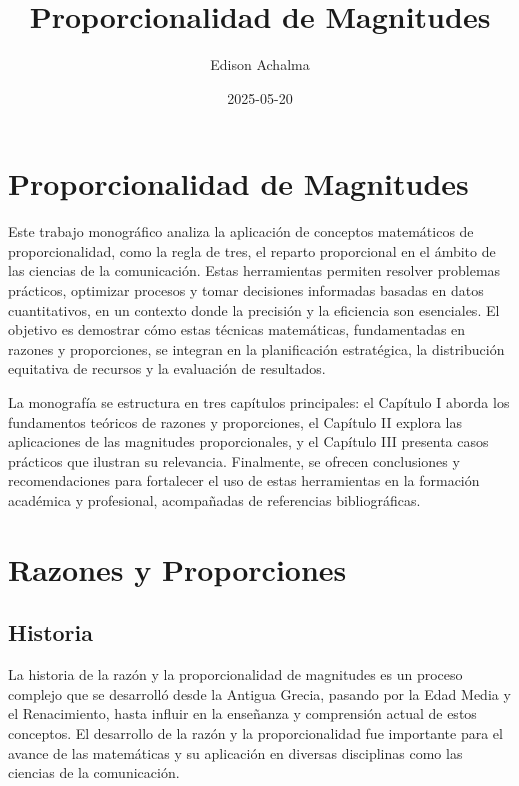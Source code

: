 \documentclass[
  stu,
  floatsintext,
  longtable,
  a4paper,
  nolmodern,
  notxfonts,
  notimes,
  colorlinks=true,linkcolor=blue,citecolor=blue,urlcolor=blue]{apa7}
\title{Proporcionalidad de Magnitudes}
\author{Edison Achalma}
\affiliation{
{Escuela Profesional de Economía, Universidad Nacional de San Cristóbal
de Huamanga}}
\date{2025-05-20}
\begin{document}
\maketitle

\hypertarget{toc}{}
\tableofcontents
\newpage
\section[Introduction]{Proporcionalidad de Magnitudes}

\setcounter{secnumdepth}{3}

\setlength\LTleft{0pt}


Este trabajo monográfico analiza la aplicación de conceptos matemáticos
de proporcionalidad, como la regla de tres, el reparto proporcional en
el ámbito de las ciencias de la comunicación. Estas herramientas
permiten resolver problemas prácticos, optimizar procesos y tomar
decisiones informadas basadas en datos cuantitativos, en un contexto
donde la precisión y la eficiencia son esenciales. El objetivo es
demostrar cómo estas técnicas matemáticas, fundamentadas en razones y
proporciones, se integran en la planificación estratégica, la
distribución equitativa de recursos y la evaluación de resultados.

La monografía se estructura en tres capítulos principales: el Capítulo I
aborda los fundamentos teóricos de razones y proporciones, el Capítulo
II explora las aplicaciones de las magnitudes proporcionales, y el
Capítulo III presenta casos prácticos que ilustran su relevancia.
Finalmente, se ofrecen conclusiones y recomendaciones para fortalecer el
uso de estas herramientas en la formación académica y profesional,
acompañadas de referencias bibliográficas.

\section{Razones y Proporciones}\label{razones-y-proporciones}

\subsection{Historia}\label{historia}

La historia de la razón y la proporcionalidad de magnitudes es un
proceso complejo que se desarrolló desde la Antigua Grecia, pasando por
la Edad Media y el Renacimiento, hasta influir en la enseñanza y
comprensión actual de estos conceptos. El desarrollo de la razón y la
proporcionalidad fue importante para el avance de las matemáticas y su
aplicación en diversas disciplinas como las ciencias de la comunicación.
\end{document}
